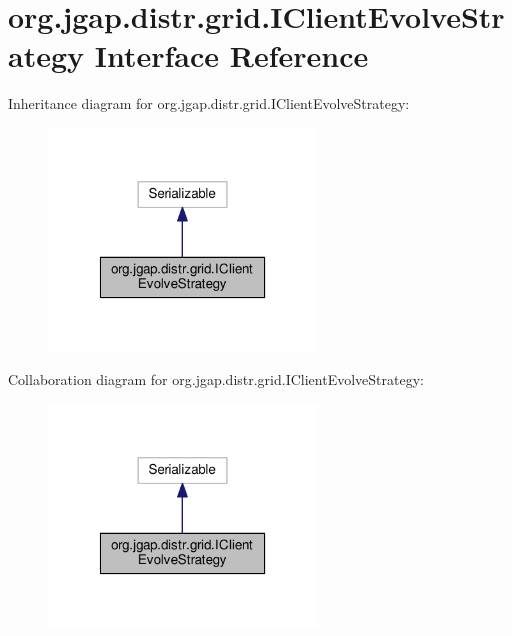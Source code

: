 \hypertarget{interfaceorg_1_1jgap_1_1distr_1_1grid_1_1_i_client_evolve_strategy}{\section{org.\-jgap.\-distr.\-grid.\-I\-Client\-Evolve\-Strategy Interface Reference}
\label{interfaceorg_1_1jgap_1_1distr_1_1grid_1_1_i_client_evolve_strategy}
}


Inheritance diagram for org.\-jgap.\-distr.\-grid.\-I\-Client\-Evolve\-Strategy\-:
\nopagebreak
\begin{figure}[H]
\begin{center}
\leavevmode
\includegraphics[width=202pt]{interfaceorg_1_1jgap_1_1distr_1_1grid_1_1_i_client_evolve_strategy__inherit__graph}
\end{center}
\end{figure}


Collaboration diagram for org.\-jgap.\-distr.\-grid.\-I\-Client\-Evolve\-Strategy\-:
\nopagebreak
\begin{figure}[H]
\begin{center}
\leavevmode
\includegraphics[width=202pt]{interfaceorg_1_1jgap_1_1distr_1_1grid_1_1_i_client_evolve_strategy__coll__graph}
\end{center}
\end{figure}

